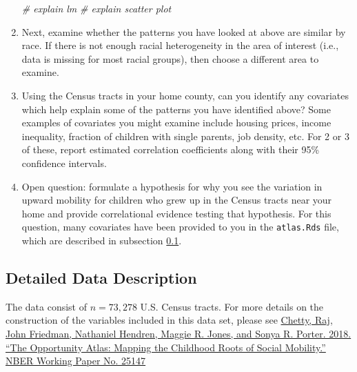 \documentclass[]{book}
\newenvironment{Shaded}{\begin{snugshade}}{\end{snugshade}}
\newcommand{\CommentTok}[1]{\textcolor[rgb]{0.56,0.35,0.01}{\textit{#1}}}
\begin{document}
\begin{enumerate}
\begin{Shaded}
\begin{Highlighting}[]
\CommentTok{# explain lm}
\CommentTok{# explain scatter plot}
\end{Highlighting}
\end{Shaded}
\item
  Next, examine whether the patterns you have looked at above are
  similar by race. If there is not enough racial heterogeneity in the
  area of interest (i.e., data is missing for most racial groups), then
  choose a different area to examine.
\item
  Using the Census tracts in your home county, can you identify any
  covariates which help explain some of the patterns you have identified
  above? Some examples of covariates you might examine include housing
  prices, income inequality, fraction of children with single parents,
  job density, etc. For 2 or 3 of these, report estimated correlation
  coefficients along with their 95\% confidence intervals.
\item
  Open question: formulate a hypothesis for why you see the variation in
  upward mobility for children who grew up in the Census tracts near
  your home and provide correlational evidence testing that hypothesis.
  For this question, many covariates have been provided to you in the
  \texttt{atlas.Rds} file, which are described in subsection
  \ref{proj1-data}.
\end{enumerate}

\subsection{Detailed Data Description}\label{proj1-data}

The data consist of \(n = 73,278\) U.S. Census tracts. For more details
on the construction of the variables included in this data set, please
see \href{http://www.nber.org/papers/w25147}{Chetty, Raj, John Friedman,
Nathaniel Hendren, Maggie R. Jones, and Sonya R. Porter. 2018. ``The
Opportunity Atlas: Mapping the Childhood Roots of Social Mobility.''
NBER Working Paper No. 25147}
\end{document}
